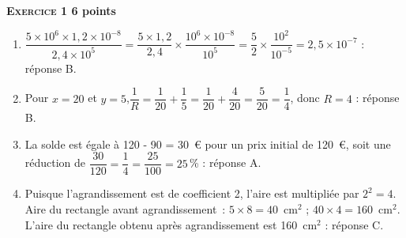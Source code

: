 \textbf{\textsc{Exercice 1} \hfill 6 points}

\medskip

%
%
%
%
\begin{enumerate}
\item $\dfrac{5 \times 10^6 \times 1,2 \times 10^{- 8} }{2,4 \times  10^5} = \dfrac{5 \times 1,2}{2,4} \times \dfrac{10^6 \times 10^{-8}}{10^5} = \dfrac{5}{2}\times \dfrac{10^2}{10^{-5}} = 2,5 \times 10^{- 7}$ : réponse B.
\item Pour $x = 20$ et $y = 5$,\:$\dfrac{1}{R} = \dfrac{1}{20} + \dfrac{1}{5} =  \dfrac{1}{20} +  \dfrac{4}{20}  =  \dfrac{5}{20}  =  \dfrac{1}{4}$, donc $R = 4$ : réponse B.
\item La solde est égale à 120 - 90 = 30~\euro{} pour un prix initial de 120~\euro, soit une réduction de $\dfrac{30}{120} = \dfrac{1}{4} = \dfrac{25}{100} = 25$\,\% : réponse A.
\item Puisque l'agrandissement est de coefficient 2, l'aire est multipliée par $2^2 = 4$. 
	Aire du rectangle avant agrandissement : $5 \times 8 = 40$~cm$^2$ ; 
	$40 \times  4 = 160$~cm$^2$.	L'aire du rectangle obtenu après agrandissement est 160~cm$^2$ :  réponse C.
\end{enumerate}

\vspace{0,5cm}

